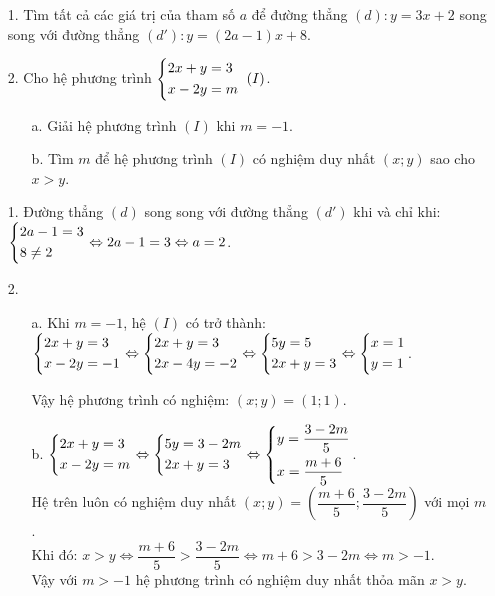 \begin{ex}
    \begin{enumerate}
        \item[1.] Tìm tất cả các giá trị của tham số $a$ để đường thẳng $(d): y=3x+2$ song song với đường thẳng $(d'): y=\left(2a-1\right)x+8$.
        \item[2.] Cho hệ phương trình $\left\{\begin{aligned}&2x+y=3\\&x-2y=m\end{aligned}\right.\ (I)$.
        \begin{itemize}
        \item[a.] Giải hệ phương trình $(I)$ khi $m=-1$.
        \item[b.] Tìm $m$ để hệ phương trình $(I)$ có nghiệm duy nhất $\left(x;y\right)$ sao cho $x>y$.
        \end{itemize}
    \end{enumerate}
\loigiai
    {
    \begin{enumerate}
        \item[1.] Đường thẳng $(d)$ song song với đường thẳng $(d')$ khi và chỉ khi:\\ $\left\{\begin{aligned}&2a-1=3\\&8\ne 2\end{aligned}\right.\Leftrightarrow 2a-1=3\Leftrightarrow a=2$.
        \item[2.]
        \begin{itemize}
        \item[a.] Khi $m=-1$, hệ $(I)$ có trở thành:\\
        $\left\{\begin{aligned}&2x+y=3\\&x-2y=-1\end{aligned}\right.\Leftrightarrow \left\{\begin{aligned}&2x+y=3\\&2x-4y=-2\end{aligned}\right.\Leftrightarrow\left\{\begin{aligned}&5y=5\\&2x+y=3\end{aligned}\right.\Leftrightarrow\left\{\begin{aligned}&x=1\\&y=1\end{aligned}\right.$.
        
      
        Vậy hệ phương trình có nghiệm: $(x;y)=(1;1)$.
        \item[b.] $\left\{\begin{aligned}&2x+y=3\\&x-2y=m\end{aligned}\right.\Leftrightarrow \left\{\begin{aligned}&5y=3-2m\\&2x+y=3\end{aligned}\right.\Leftrightarrow \left\{\begin{aligned}&y=\dfrac{3-2m}{5}\\&x=\dfrac{m+6}{5}\end{aligned}\right.$.\\
        Hệ trên luôn có nghiệm duy nhất $(x;y)=\left(\dfrac{m+6}{5};\dfrac{3-2m}{5}\right)$ với mọi $m$.\\
        Khi đó: $x>y\Leftrightarrow \dfrac{m+6}{5}>\dfrac{3-2m}{5}\Leftrightarrow m+6>3-2m\Leftrightarrow m>-1$.\\
        Vậy với $m>-1$ hệ phương trình có nghiệm duy nhất thỏa mãn $x>y$.
        \end{itemize}
    \end{enumerate}
    }
\end{ex}
